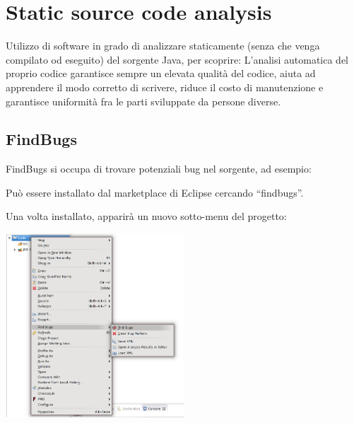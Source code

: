 \documentclass[presentation]{beamer}
\begin{document}
\section{Static source code analysis}

 {
	 {
		Utilizzo di software in grado di analizzare staticamente (senza che venga compilato od eseguito) del sorgente Java, per scoprire:
	}
	 {
		L'analisi automatica del proprio codice garantisce sempre un elevata qualità del codice, aiuta ad apprendere il modo corretto di scrivere, riduce il costo di manutenzione e garantisce uniformità fra le parti sviluppate da persone diverse.
	}
}

\subsection{FindBugs}

 {
	 {
		FindBugs si occupa di trovare potenziali bug nel sorgente, ad esempio:
	}
}

 {
	 {
		Può essere installato dal marketplace di Eclipse cercando ``findbugs''.
		
		Una volta installato, apparirà un nuovo sotto-menu del progetto:
		
		\centering
		\includegraphics[width=0.5\textwidth]{img/findbugs}
	}
}
\end{document}
